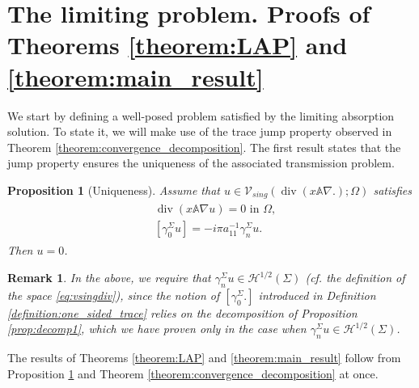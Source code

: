 \documentclass[report]{elsarticle}
\newtheorem{proposition}[theorem]{Proposition}
\newtheorem{remark}[theorem]{Remark}
\numberwithin{theorem}{section}
\begin{document}
\section{The limiting problem. Proofs of Theorems \ref{theorem:LAP} and \ref{theorem:main_result}}
\label{sec:LAP_Problem}
We start by defining a well-posed problem satisfied by the limiting absorption solution. To state it, we will make use of the trace jump property observed in Theorem \ref{theorem:convergence_decomposition}. The first result states that the jump property ensures the uniqueness of the associated transmission problem. 
\begin{proposition}[Uniqueness]
	\label{theorem:Aplus}
	Assume that $u\in \mathcal{V}_{sing}(\operatorname{div}(x\mathbb{A}\nabla.);\Omega)$ satisfies
	\begin{align}
		\label{eq:alphaAnablaU}
		\begin{split}
			&\operatorname{div}(x\mathbb{A}\nabla u)=0 \text{ in }\Omega,\\
			&[\gamma_0^{\Sigma}u]=-i\pi a_{11}^{-1}\gamma_n^{\Sigma}u.
		\end{split}
	\end{align}
	Then $u=0$.
\end{proposition}
\begin{remark}
	In the above, we require that $\gamma_n^{\Sigma}u\in \mathcal{H}^{1/2}(\Sigma)$ (cf. the definition of the space \eqref{eq:vsingdiv}), since the notion of $[\gamma_0^{\Sigma}.]$ introduced in Definition \ref{definition:one_sided_trace} relies on the decomposition of Proposition \ref{prop:decomp1}, which we have proven only in the case when $\gamma_n^{\Sigma}u\in \mathcal{H}^{1/2}(\Sigma)$. 
\end{remark}
The results of Theorems \ref{theorem:LAP} and \ref{theorem:main_result} follow from Proposition \ref{theorem:Aplus} and Theorem \ref{theorem:convergence_decomposition} at once. 
\end{document}

